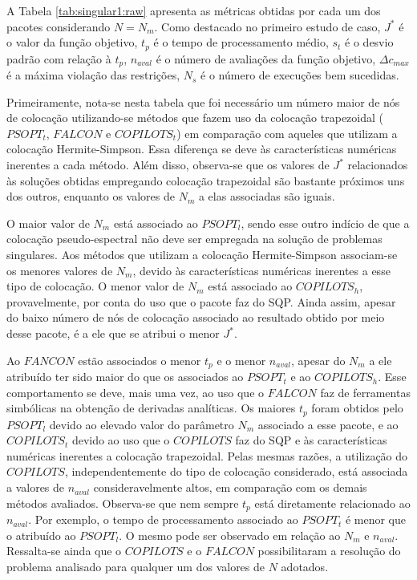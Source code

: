 A Tabela \ref{tab:singular1:raw} apresenta as métricas obtidas por cada um dos pacotes considerando $ N = N_m $. Como destacado no primeiro estudo de caso, $ J^* $ é o valor da função objetivo, $ t_p $ é o  tempo de processamento médio, $ s_t $ é o desvio padrão com relação à  $ t_p $, $ n_{aval} $ é o número de avaliações da função objetivo, $ \Delta c_{max} $ é a máxima violação das restrições, $ N_s $ é o número de execuções bem sucedidas.



Primeiramente, nota-se nesta tabela que foi necessário um número maior de nós de colocação utilizando-se métodos que fazem uso da colocação trapezoidal ($ PSOPT_t $, $ FALCON $ e $ COPILOTS_t $) em comparação com aqueles que utilizam a colocação Hermite-Simpson. Essa diferença se deve às características numéricas inerentes a cada método. Além disso, observa-se que os valores de $ J^* $ relacionados às soluções obtidas empregando colocação trapezoidal são bastante próximos uns dos outros, enquanto os valores de $ N_m $ a elas associadas são iguais.

O maior valor de $ N_m $ está associado ao $ PSOPT_l $, sendo esse outro indício de que a colocação pseudo-espectral não deve ser empregada na solução de problemas singulares. Aos métodos que utilizam a colocação Hermite-Simpson associam-se os menores valores de $ N_m $, devido às características numéricas inerentes a esse tipo de colocação. O menor valor de $ N_m $ está associado ao $ COPILOTS_h $, provavelmente, por conta do uso que o pacote faz do SQP. Ainda assim, apesar do baixo número de nós de colocação associado ao resultado obtido por meio desse pacote, é a ele que se atribui o menor $ J^* $. 

Ao $ FANCON $ estão associados o menor $ t_p $ e o menor $ n_{aval} $, apesar do $ N_m $ a ele atribuído ter sido maior do que os associados ao $ PSOPT_t $ e ao $ COPILOTS_h $. Esse comportamento se deve, mais uma vez, ao uso que o $ FALCON $ faz de ferramentas simbólicas na obtenção de derivadas analíticas. Os maiores $ t_p $ foram obtidos pelo $ PSOPT_l $ devido ao elevado valor do parâmetro $ N_m $ associado a esse pacote, e ao $ COPILOTS_t $ devido ao uso que o $ COPILOTS $ faz do SQP e às características numéricas inerentes a colocação trapezoidal. Pelas mesmas razões, a utilização do $ COPILOTS $, independentemente do tipo de colocação considerado, está associada a valores de $ n_{aval} $ consideravelmente altos, em comparação com os demais métodos avaliados. Observa-se que nem sempre $ t_p $ está diretamente relacionado ao $ n_{aval} $. Por exemplo, o tempo de processamento associado ao $ PSOPT_t $ é menor que o atribuído ao $ PSOPT_l $. O mesmo pode ser observado em relação ao $ N_m $ e $ n_{aval} $. Ressalta-se ainda que o $ COPILOTS $ e o $ FALCON $ possibilitaram a resolução do problema analisado para qualquer um dos valores de $ N $ adotados. 

